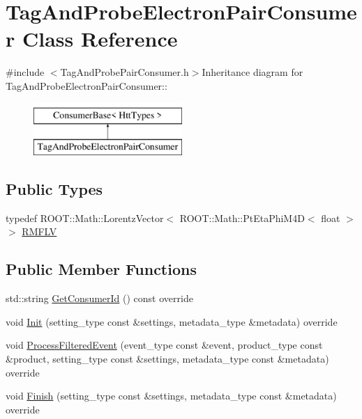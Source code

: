 \hypertarget{classTagAndProbeElectronPairConsumer}{
\section{TagAndProbeElectronPairConsumer Class Reference}
\label{classTagAndProbeElectronPairConsumer}
}


{\ttfamily \#include $<$TagAndProbePairConsumer.h$>$}Inheritance diagram for TagAndProbeElectronPairConsumer::\begin{figure}[H]
\begin{center}
\leavevmode
\includegraphics[height=2cm]{classTagAndProbeElectronPairConsumer}
\end{center}
\end{figure}
\subsection*{Public Types}
\begin{DoxyCompactItemize}
\item 
typedef ROOT::Math::LorentzVector$<$ ROOT::Math::PtEtaPhiM4D$<$ float $>$ $>$ \hyperlink{classTagAndProbeElectronPairConsumer_a4b9ec909b608de08bdca151d4ef6ba45}{RMFLV}
\end{DoxyCompactItemize}
\subsection*{Public Member Functions}
\begin{DoxyCompactItemize}
\item 
std::string \hyperlink{classTagAndProbeElectronPairConsumer_adbd1968930d4a8c023f92359beabdac3}{GetConsumerId} () const override
\item 
void \hyperlink{classTagAndProbeElectronPairConsumer_aa2d7db73740dc10f504d07e0840140a0}{Init} (setting\_\-type const \&settings, metadata\_\-type \&metadata) override
\item 
void \hyperlink{classTagAndProbeElectronPairConsumer_afc01b5796584a80d328d00454fc8f8dc}{ProcessFilteredEvent} (event\_\-type const \&event, product\_\-type const \&product, setting\_\-type const \&settings, metadata\_\-type const \&metadata) override
\item 
void \hyperlink{classTagAndProbeElectronPairConsumer_a97da0cf11b36504fbd912e524fd496f9}{Finish} (setting\_\-type const \&settings, metadata\_\-type const \&metadata) override
\end{DoxyCompactItemize}


